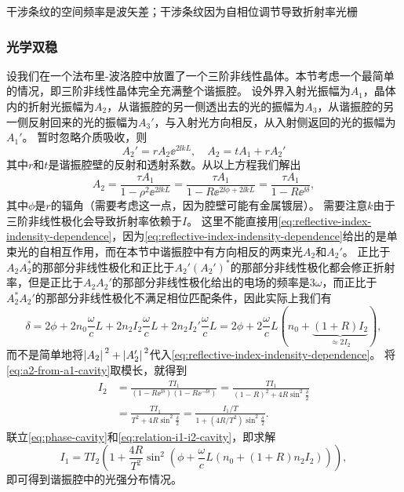 
干涉条纹的空间频率是波矢差；干涉条纹因为自相位调节导致折射率光栅

\subsubsection{光学双稳}

设我们在一个法布里-波洛腔中放置了一个三阶非线性晶体。本节考虑一个最简单的情况，即三阶非线性晶体完全充满整个谐振腔。
设外界入射光振幅为$A_1$，晶体内的折射光振幅为$A_2$，从谐振腔的另一侧透出去的光的振幅为$A_3$，从谐振腔的另一侧反射回来的光的振幅为$A_3'$，与入射光方向相反，从入射侧返回的光的振幅为$A_1'$。
暂时忽略介质吸收，则
\begin{equation}
    A_2' = r A_2 \ee^{2 \ii k L}, \quad A_2 = t A_1 + r A_2'
\end{equation}
其中$r$和$t$是谐振腔壁的反射和透射系数。从以上方程我们解出
\begin{equation}
    A_2 = \frac{\tau A_1}{1 - \rho^2 \ee^{2 \ii k L}} = \frac{\tau A_1}{1 - R \ee^{2 \ii \phi + 2 \ii k L}} = \frac{\tau A_1}{1 - R \ee^{\ii \delta}},
    \label{eq:a2-from-a1-cavity}
\end{equation}
其中$\phi$是$r$的辐角（需要考虑这一点，因为腔壁可能有金属镀层）。
需要注意$k$由于三阶非线性极化会导致折射率依赖于$I$。
这里不能直接用\eqref{eq:reflective-index-indensity-dependence}，因为\eqref{eq:reflective-index-indensity-dependence}给出的是单束光的自相互作用，而在本节中谐振腔中有方向相反的两束光$A_2$和$A_2'$。
正比于$A_2 A_2^*$的那部分非线性极化和正比于$A_2' (A_2')^*$的那部分非线性极化都会修正折射率，但是正比于$A_2 A_2'$的那部分非线性极化给出的电场的频率是$3 \omega$，而正比于$A_2^* A_2'$的那部分非线性极化不满足相位匹配条件，因此实际上我们有
\begin{equation}
    \delta = 2 \phi + 2 n_0 \frac{\omega}{c} L + 2 n_2 I_2 \frac{\omega}{c} L + 2 n_2 I_{2}' \frac{\omega}{c} L = 2 \phi + 2 \frac{\omega}{c} L (n_0 + \underbrace{(1+R) I_2}_{\approx 2 I_2}),
    \label{eq:phase-cavity}
\end{equation}
而不是简单地将$\abs*{A_2}^2 + \abs*{A_2'}^2$代入\eqref{eq:reflective-index-indensity-dependence}。
将\eqref{eq:a2-from-a1-cavity}取模长，就得到
\begin{equation}
    \begin{aligned}
        I_2 &= \frac{T I_1}{(1 - R \ee^{\ii \delta}) (1 - R \ee^{- \ii \delta})} = \frac{T I_1}{(1 - R)^2 + 4 R \sin^2 \frac{\delta}{2}} \\
        &= \frac{T I_1}{T^2 + 4 R \sin^2 \frac{\delta}{2}} = \frac{I_1 / T}{1 + (4 R / T^2) \sin^2 \frac{\delta}{2}}.
    \end{aligned}
    \label{eq:relation-i1-i2-cavity}
\end{equation}
联立\eqref{eq:phase-cavity}和\eqref{eq:relation-i1-i2-cavity}，即求解
\begin{equation}
    I_1 = T I_2 \left( 1 + \frac{4R}{T^2} \sin^2\left( \phi + \frac{\omega}{c} L (n_0 + (1+R) n_2 I_2) \right) \right),
    \label{eq:cavity-bistability}
\end{equation}
即可得到谐振腔中的光强分布情况。

